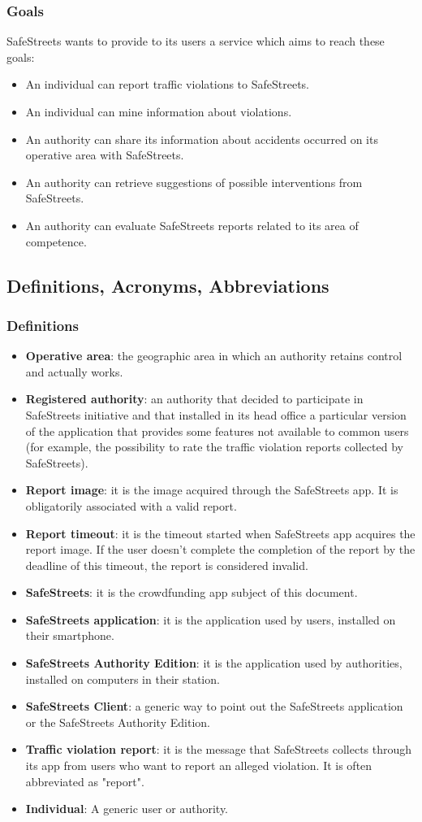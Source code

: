 \documentclass{article}
\newcommand\goal[1]{\item[{[G#1]}] }
\begin{document}
			\subsubsection{Goals}
				SafeStreets wants to provide to its users a service which aims to reach these goals:
				\begin{itemize}
					\goal{1}An individual can report traffic violations to SafeStreets.
					\goal{2}An individual can mine information about violations.					
					\goal{3}An authority can share its information about accidents occurred on its operative area with SafeStreets.
					\goal{4}An authority can retrieve suggestions of possible interventions from SafeStreets.
					\goal{5}An authority can evaluate SafeStreets reports related to its area of competence.
				\end{itemize}
				
				
		\subsection{Definitions, Acronyms, Abbreviations}
			\subsubsection{Definitions}
				\begin{itemize}
					\item \textbf{Operative area}: the geographic area in which an authority retains  control and actually works.
					\item \textbf{Registered authority}: an authority that decided to participate in SafeStreets initiative and that installed in its head office a particular version of the application that provides some features not available to common users (for example, the possibility to rate the traffic violation reports collected by SafeStreets).
					\item \textbf{Report image}: it is the image acquired through the SafeStreets app. It is obligatorily associated with a valid report.
					\item \textbf{Report timeout}: it is the timeout started when SafeStreets app acquires the report image. If the user doesn't complete the completion of the report by the deadline of this timeout, the report is considered invalid.
					\item \textbf{SafeStreets}: it is the crowdfunding app subject of this document.
					\item \textbf{SafeStreets application}: it is the application used by users, installed on their smartphone.
					\item \textbf{SafeStreets Authority Edition}: it is the application used by authorities, installed on computers in their station.
					\item \textbf{SafeStreets Client}: a generic way to point out the SafeStreets application or the SafeStreets Authority Edition.
					\item \textbf{Traffic violation report}: it is the message that SafeStreets collects through its app from users who want to report an alleged violation. It is often abbreviated as "report".
					\item \textbf{Individual}: A generic user or authority.
				\end{itemize}
\end{document}

